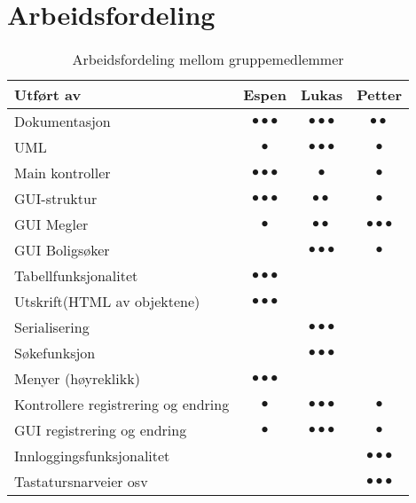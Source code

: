 \section{Arbeidsfordeling}

\begin{table}[ht!]
\caption{Arbeidsfordeling mellom gruppemedlemmer}
\label{tab:arbeidsfordeling}
\begin{tabular}{|p{6.8cm}|c|c|c|}

\hline
Utført av					&Espen&Lukas	&Petter\\ \hline
Dokumentasjon				&$\bullet\bullet\bullet$&$\bullet\bullet\bullet$&$\bullet\bullet$\\	\hline
UML							&$\bullet$&$\bullet\bullet\bullet$&$\bullet$\\ \hline
Main kontroller				&$\bullet\bullet\bullet$&$\bullet$&$\bullet$\\ \hline
GUI-struktur					&$\bullet\bullet\bullet$&$\bullet\bullet$&$\bullet$\\ \hline
GUI Megler					&$\bullet$&$\bullet\bullet$&$\bullet\bullet\bullet$\\ \hline
GUI Boligsøker				&&$\bullet\bullet\bullet$&$\bullet$\\ \hline
Tabellfunksjonalitet			&$\bullet\bullet\bullet$&&\\ \hline
Utskrift(HTML av objektene)	&$\bullet\bullet\bullet$&&\\ \hline
Serialisering				&&$\bullet\bullet\bullet$&\\ \hline
Søkefunksjon					&&$\bullet\bullet\bullet$&\\ \hline
Menyer (høyreklikk)			&$\bullet\bullet\bullet$&&\\ \hline
Kontrollere registrering og endring		&$\bullet$&$\bullet\bullet\bullet$&$\bullet$\\ \hline
GUI registrering og endring		&$\bullet$&$\bullet\bullet\bullet$&$\bullet$\\ \hline
Innloggingsfunksjonalitet							&&&$\bullet\bullet\bullet$\\ \hline
Tastatursnarveier osv		&&&$\bullet\bullet\bullet$\\ \hline

\hline
\end{tabular}
\end{table}
